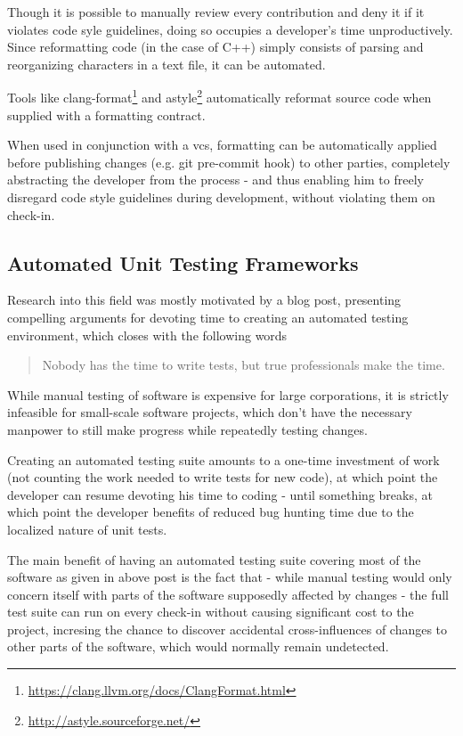 Though it is possible to manually review every contribution and deny it if it violates code syle guidelines, doing so occupies a developer's time unproductively. Since reformatting code (in the case of C++) simply consists of parsing and reorganizing characters in a text file, it can be automated.

Tools like clang-format\footnote{\url{https://clang.llvm.org/docs/ClangFormat.html}} and astyle\footnote{\url{http://astyle.sourceforge.net/}} automatically reformat source code when supplied with a formatting contract.

When used in conjunction with a \gls{vcs}, formatting can be automatically applied before publishing changes (e.g. git pre-commit hook) to other parties, completely abstracting the developer from the process - and thus enabling him to freely disregard code style guidelines during development, without violating them on check-in.

\subsection{Automated Unit Testing Frameworks}\label{sec:autotest}
Research into this field was mostly motivated by a blog post, presenting compelling arguments for devoting time to creating an automated testing environment, which closes with the following words
\begin{quote}
Nobody has the time to write tests, but true professionals make the time. 
\end{quote}

While manual testing of software is expensive for large corporations, it is strictly infeasible for small-scale software projects, which don't have the necessary manpower to still make progress while repeatedly testing changes.

Creating an automated testing suite amounts to a one-time investment of work (not counting the work needed to write tests for new code), at which point the developer can resume devoting his time to coding - until something breaks, at which point the developer benefits of reduced bug hunting time due to the localized nature of unit tests.

The main benefit of having an automated testing suite covering most of the software as given in above post is the fact that - while manual testing would only concern itself with parts of the software supposedly affected by changes - the full test suite can run on every check-in without causing significant cost to the project, incresing the chance to discover accidental cross-influences of changes to other parts of the software, which would normally remain undetected.

